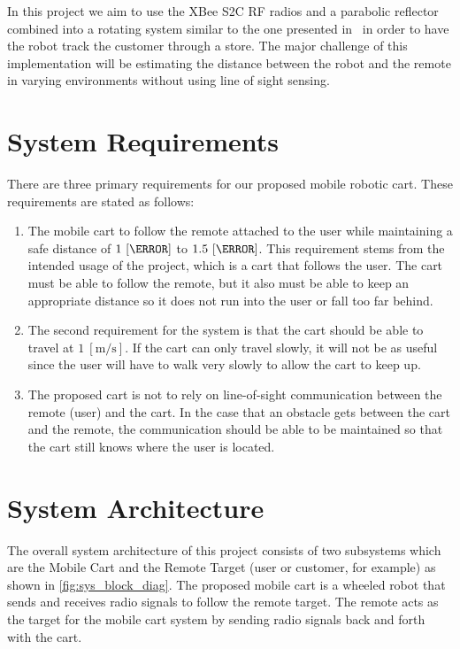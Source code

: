 \documentclass[letterpaper,12pt]{article}   %
\begin{document}
\vspace*{12pt}
\noindent
In this project we aim to use the XBee S2C RF radios and a parabolic reflector combined into a rotating system similar to the one presented in~\cite{Miah2018-Intelligent} in order to have the robot track the customer through a store. The major challenge of this implementation will be estimating the distance between the robot and the remote in varying environments without using line of sight sensing.

\section{System Requirements}
There are three primary requirements for our proposed mobile robotic cart. These requirements are stated as follows:

\begin{enumerate}
  \item The mobile cart to follow the remote attached to the user while maintaining a safe distance of $1~[\meter]$ to $1.5~[\meter]$. This requirement stems from the intended usage of the project, which is a cart that follows the user. The cart must be able to follow the remote, but it also must be able to keep an appropriate distance so it does not run into the user or fall too far behind.

  \item The second requirement for the system is that the cart should be able to travel at $1~[\si{\meter\per\second}]$. If the cart can only travel slowly, it will not be as useful since the user will have to walk very slowly to allow the cart to keep up.

  \item The proposed cart is not to rely on line-of-sight communication between the remote (user) and the cart. In the case that an obstacle gets between the cart and the remote, the communication should be able to be maintained so that the cart still knows where the user is located.
\end{enumerate}


\section{System Architecture}
The overall system architecture of this project consists of two subsystems which are the Mobile Cart and the Remote Target (user or customer, for example) as shown in \autoref{fig:sys_block_diag}. The proposed mobile cart is a wheeled robot that sends and receives radio signals to follow the remote target. The remote acts as the target for the mobile cart system by sending radio signals back and forth with the cart.
\end{document}
